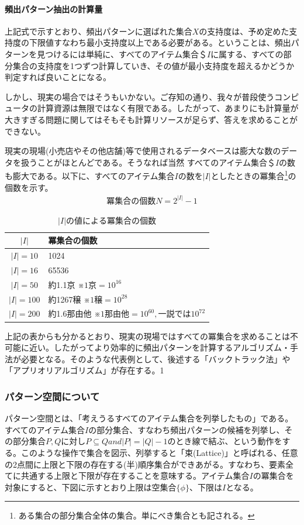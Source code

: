 \documentclass[dvipdfmx]{jsarticle}
\begin{document}
\paragraph{頻出パターン抽出の計算量}
上記式で示すとおり、頻出パターンに選ばれた集合$X$の支持度は、予め定めた支持度の下限値すなわち最小支持度以上である必要がある。ということは、頻出パターンを見つけるには単純に、すべてのアイテム集合＄$I$に属する、すべての部分集合の支持度を1つずつ計算していき、その値が最小支持度を超えるかどうか判定すれば良いことになる。\par
しかし、現実の場合ではそうもいかない。ご存知の通り、我々が普段使うコンピュータの計算資源は無限ではなく有限である。したがって、あまりにも計算量が大きすぎる問題に関してはそもそも計算リソースが足らず、答えを求めることができない。\par
現実の現場(小売店やその他店舗)等で使用されるデータベースは膨大な数のデータを扱うことがほとんどである。そうなれば当然
すべてのアイテム集合＄$I$の数も膨大である。以下に、すべてのアイテム集合$I$の数を$|I|$としたときの冪集合\footnote{ある集合の部分集合全体の集合。単にべき集合とも記される。}の個数を示す。
\begin{gather*}
  冪集合の個数N = 2^{|I|}-1
\end{gather*}
\begin{table}[H]
  \begin{center}
    \caption{$|I|の値による冪集合の個数$}
    \begin{tabular}{|c|l|} \hline
      $|I|$ & 冪集合の個数 \\ \hline
      $|I| = 10$ & 1024 \\
      $|I| = 16$ & 65536 \\
      $|I| = 50$ & 約1.1京 ※$1京=10^{16}$\\
      $|I| = 100$ & 約1267穣 ※$1穣=10^{28}$\\
      $|I| = 200$ & 約1.6那由他 ※$1那由他=10^{60}, 一説では10^{72}$ \\ \hline
    \end{tabular}
    \label{hyo01}
  \end{center}
\end{table}
上記の表からも分かるとおり、現実の現場ではすべての冪集合を求めることは不可能に近い。したがってより効率的に頻出パターンを計算するアルゴリズム・手法が必要となる。そのような代表例として、後述する「バックトラック法」や「アプリオリアルゴリズム」が存在する。1
\subsubsection{パターン空間について}
パターン空間とは、「考えうるすべてのアイテム集合を列挙したもの」である。すべてのアイテム集合$I$の部分集合、すなわち頻出パターンの候補を列挙し、その部分集合$P,Q$に対し$P \subseteq Q and |P| = |Q|-1$のとき線で結ぶ、という動作をする。このような操作で集合を図示、列挙すると「束(Lattice)」と呼ばれる、任意の2点間に上限と下限の存在する(半)順序集合ができあがる。すなわち、要素全てに共通する上限と下限が存在することを意味する。アイテム集合$I$の冪集合を対象にすると、下図に示すとおり上限は空集合$\{\phi\}$、下限は$I$となる。
\end{document}
